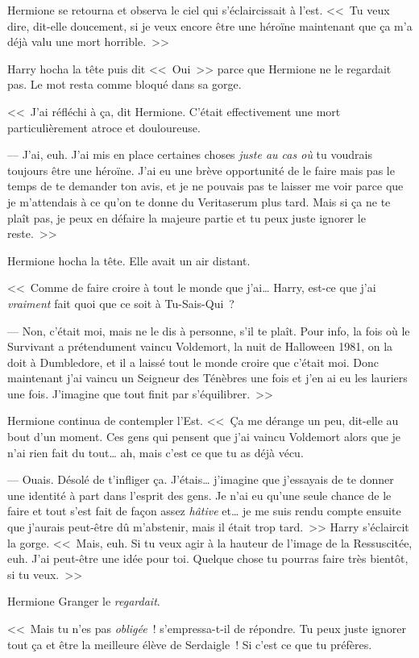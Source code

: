Hermione se retourna et observa le ciel qui s'éclaircissait à l'est. <<~Tu veux dire, dit-elle doucement, si je veux encore être une héroïne maintenant que ça m'a déjà valu une mort horrible.~>>

Harry hocha la tête puis dit <<~Oui~>> parce que Hermione ne le regardait pas. Le mot resta comme bloqué dans sa gorge.

<<~J'ai réfléchi à ça, dit Hermione. C'était effectivement une mort particulièrement atroce et douloureuse.

--- J'ai, euh. J'ai mis en place certaines choses \emph{juste au cas où} tu voudrais toujours être une héroïne. J'ai eu une brève opportunité de le faire mais pas le temps de te demander ton avis, et je ne pouvais pas te laisser me voir parce que je m'attendais à ce qu'on te donne du Veritaserum plus tard. Mais si ça ne te plaît pas, je peux en défaire la majeure partie et tu peux juste ignorer le reste.~>>

Hermione hocha la tête. Elle avait un air distant.

<<~Comme de faire croire à tout le monde que j'ai… Harry, est-ce que j'ai \emph{vraiment} fait quoi que ce soit à Tu-Sais-Qui~?

--- Non, c'était moi, mais ne le dis à personne, s'il te plaît. Pour info, la fois où le Survivant a prétendument vaincu Voldemort, la nuit de Halloween 1981, on la doit à Dumbledore, et il a laissé tout le monde croire que c'était moi. Donc maintenant j'ai vaincu un Seigneur des Ténèbres une fois et j'en ai eu les lauriers une fois. J'imagine que tout finit par s'équilibrer.~>>

Hermione continua de contempler l'Est. <<~Ça me dérange un peu, dit-elle au bout d'un moment. Ces gens qui pensent que j'ai vaincu Voldemort alors que je n'ai rien fait du tout… ah, mais c'est ce que tu as déjà vécu.

--- Ouais. Désolé de t'infliger ça. J'étais… j'imagine que j'essayais de te donner une identité à part dans l'esprit des gens. Je n'ai eu qu'une seule chance de le faire et tout s'est fait de façon assez \emph{hâtive} et… je me suis rendu compte ensuite que j'aurais peut-être dû m'abstenir, mais il était trop tard.~>> Harry s'éclaircit la gorge. <<~Mais, euh. Si tu veux agir à la hauteur de l'image de la Ressuscitée, euh. J'ai peut-être une idée pour toi. Quelque chose tu pourras faire très bientôt, si tu veux.~>>

Hermione Granger le \emph{regardait}.

<<~Mais tu n'es pas \emph{obligée}~! s'empressa-t-il de répondre. Tu peux juste ignorer tout ça et être la meilleure élève de Serdaigle~! Si c'est ce que tu préfères.

